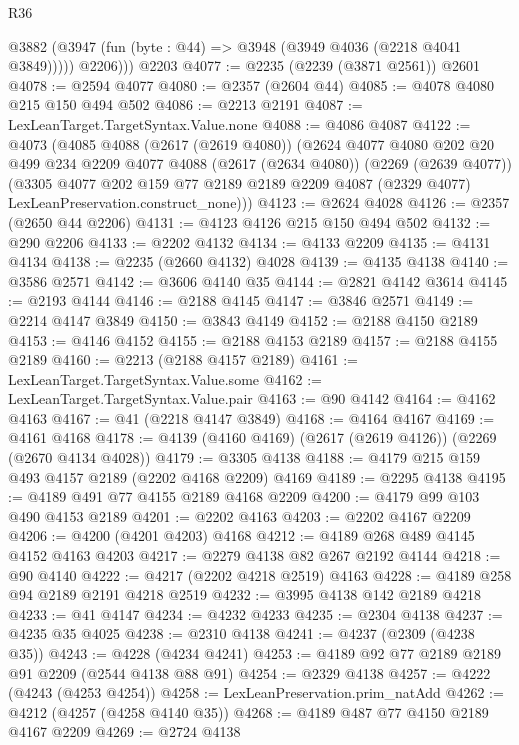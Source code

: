 \begin{lexlean}{R36}
\begin{coremodule}
        @3882 (@3947 (fun (byte : @44) => @3948 (@3949 @4036 (@2218 @4041 @3849)))))
          @2206)))
    @2203
@4077 := @2235 (@2239 (@3871 @2561)) @2601
@4078 := @2594 @4077
@4080 := @2357 (@2604 @44)
@4085 := @4078 @4080 @215 @150 @494 @502
@4086 := @2213 @2191
@4087 := LexLeanTarget.TargetSyntax.Value.none
@4088 := @4086 @4087
@4122 := @4073
    (@4085
      @4088
      (@2617 (@2619 @4080))
      (@2624
        @4077
        @4080
        @202
        @20
        @499
        @234
        @2209
        @4077
        @4088
        (@2617 (@2634 @4080))
        (@2269 (@2639 @4077))
        (@3305
          @4077
          @202
          @159
          @77
          @2189
          @2189
          @2209
          @4087
          (@2329 @4077)
          LexLeanPreservation.construct_none)))
@4123 := @2624 @4028
@4126 := @2357 (@2650 @44 @2206)
@4131 := @4123 @4126 @215 @150 @494 @502
@4132 := @290 @2206
@4133 := @2202 @4132
@4134 := @4133 @2209
@4135 := @4131 @4134
@4138 := @2235 (@2660 @4132) @4028
@4139 := @4135 @4138
@4140 := @3586 @2571
@4142 := @3606 @4140 @35
@4144 := @2821 @4142 @3614
@4145 := @2193 @4144
@4146 := @2188 @4145
@4147 := @3846 @2571
@4149 := @2214 @4147 @3849
@4150 := @3843 @4149
@4152 := @2188 @4150 @2189
@4153 := @4146 @4152
@4155 := @2188 @4153 @2189
@4157 := @2188 @4155 @2189
@4160 := @2213 (@2188 @4157 @2189)
@4161 := LexLeanTarget.TargetSyntax.Value.some
@4162 := LexLeanTarget.TargetSyntax.Value.pair
@4163 := @90 @4142
@4164 := @4162 @4163
@4167 := @41 (@2218 @4147 @3849)
@4168 := @4164 @4167
@4169 := @4161 @4168
@4178 := @4139 (@4160 @4169) (@2617 (@2619 @4126)) (@2269 (@2670 @4134 @4028))
@4179 := @3305 @4138
@4188 := @4179 @215 @159 @493 @4157 @2189 (@2202 @4168 @2209) @4169
@4189 := @2295 @4138
@4195 := @4189 @491 @77 @4155 @2189 @4168 @2209
@4200 := @4179 @99 @103 @490 @4153 @2189
@4201 := @2202 @4163
@4203 := @2202 @4167 @2209
@4206 := @4200 (@4201 @4203) @4168
@4212 := @4189 @268 @489 @4145 @4152 @4163 @4203
@4217 := @2279 @4138 @82 @267 @2192 @4144
@4218 := @90 @4140
@4222 := @4217 (@2202 @4218 @2519) @4163
@4228 := @4189 @258 @94 @2189 @2191 @4218 @2519
@4232 := @3995 @4138 @142 @2189 @4218
@4233 := @41 @4147
@4234 := @4232 @4233
@4235 := @2304 @4138
@4237 := @4235 @35 @4025
@4238 := @2310 @4138
@4241 := @4237 (@2309 (@4238 @35))
@4243 := @4228 (@4234 @4241)
@4253 := @4189 @92 @77 @2189 @2189 @91 @2209 (@2544 @4138 @88 @91)
@4254 := @2329 @4138
@4257 := @4222 (@4243 (@4253 @4254))
@4258 := LexLeanPreservation.prim_natAdd
@4262 := @4212 (@4257 (@4258 @4140 @35))
@4268 := @4189 @487 @77 @4150 @2189 @4167 @2209
@4269 := @2724 @4138

\end{coremodule}
\end{lexlean}
